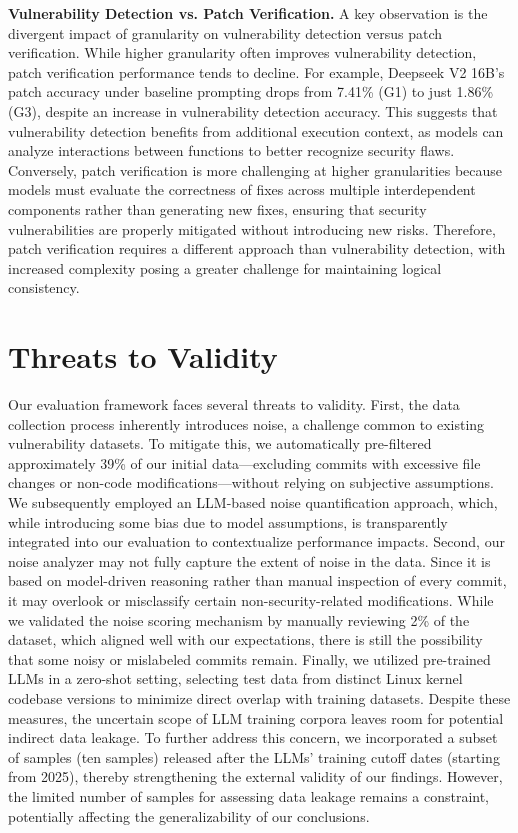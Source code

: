 \documentclass[sigconf]{acmart}
\begin{document}
\textbf{Vulnerability Detection vs. Patch Verification.} A key observation is the divergent impact of granularity on vulnerability detection versus patch verification. While higher granularity often improves vulnerability detection, patch verification performance tends to decline. For example, Deepseek V2 16B’s patch accuracy under baseline prompting drops from 7.41\% (G1) to just 1.86\% (G3), despite an increase in vulnerability detection accuracy. This suggests that vulnerability detection benefits from additional execution context, as models can analyze interactions between functions to better recognize security flaws. Conversely, patch verification is more challenging at higher granularities because models must evaluate the correctness of fixes across multiple interdependent components rather than generating new fixes, ensuring that security vulnerabilities are properly mitigated without introducing new risks. Therefore, patch verification requires a different approach than vulnerability detection, with increased complexity posing a greater challenge for maintaining logical consistency.


\section{Threats to Validity}
\label{section:threats}
Our evaluation framework faces several threats to validity. First, the data collection process inherently introduces noise, a challenge common to existing vulnerability datasets. To mitigate this, we automatically pre-filtered approximately 39\% of our initial data—excluding commits with excessive file changes or non-code modifications—without relying on subjective assumptions. We subsequently employed an LLM-based noise quantification approach, which, while introducing some bias due to model assumptions, is transparently integrated into our evaluation to contextualize performance impacts.
Second, our noise analyzer may not fully capture the extent of noise in the data. Since it is based on model-driven reasoning rather than manual inspection of every commit, it may overlook or misclassify certain non-security-related modifications. While we validated the noise scoring mechanism by manually reviewing 2\% of the dataset, which aligned well with our expectations, there is still the possibility that some noisy or mislabeled commits remain.
Finally, we utilized pre-trained LLMs in a zero-shot setting, selecting test data from distinct Linux kernel codebase versions to minimize direct overlap with training datasets. Despite these measures, the uncertain scope of LLM training corpora leaves room for potential indirect data leakage. To further address this concern, we incorporated a subset of samples (ten samples) released after the LLMs' training cutoff dates (starting from 2025), thereby strengthening the external validity of our findings. However, the limited number of samples for assessing data leakage remains a constraint, potentially affecting the generalizability of our conclusions.
\end{document}

